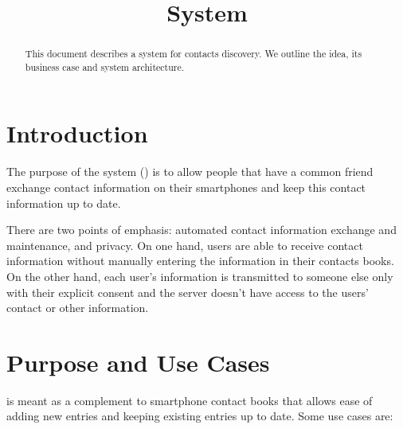 \documentclass[a4paper, 10pt]{article}
\title{\longProduct{} System}
\begin{document}
\maketitle

\begin{abstract}
This document describes a system for contacts discovery. We outline the idea, its business case and system architecture.
\end{abstract}

\tableofcontents

\section{Introduction}

The purpose of the \longProduct{} system (\commercialName{}) is to allow people that have a common friend exchange contact information on their smartphones and keep this contact 
information up to date.

There are two points of emphasis: automated contact information exchange and maintenance, and privacy. On one hand, users are able to receive contact information without manually 
entering the information in their contacts books. On the other hand, each user's information is transmitted to someone else only with their explicit consent and the server doesn't 
have access to the users' contact or other information.

\section{Purpose and Use Cases}

\commercialName{} is meant as a complement to smartphone contact books that allows ease of adding new entries and keeping existing entries up to date. Some use cases are:
\end{document}
